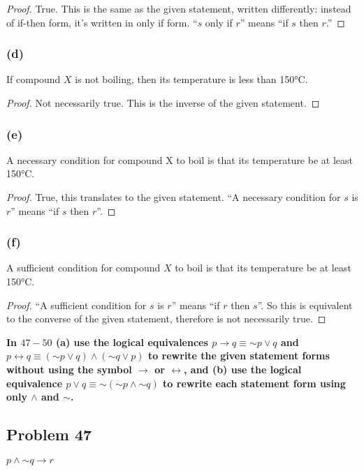 \documentclass[14pt]{extarticle}
\newcommand{\bic}{\leftrightarrow}
\begin{document}
\begin{proof}
True. This is the same as the given statement, written differently: instead of if-then form, it's written in only if form. ``$s$ only if $r$'' means ``if $s$ then $r$.''
\end{proof}

\subsubsection{(d)}
If compound $X$ is not boiling, then its temperature is less than 150°C.

\begin{proof}
Not necessarily true. This is the inverse of the given statement.
\end{proof}

\subsubsection{(e)}
A necessary condition for compound X to boil is that its temperature be at least 150°C.

\begin{proof}
True, this translates to the given statement. ``A necessary condition for $s$ is $r$'' means ``if $s$ then $r$''.
\end{proof}

\subsubsection{(f)}
A sufficient condition for compound $X$ to boil is that its temperature be at least 150°C.

\begin{proof}
``A sufficient condition for $s$ is $r$'' means ``if $r$ then $s$''. So this is equivalent to the converse of the given statement, therefore is not necessarily true. 
\end{proof}

{\bf In $47-50$ (a) use the logical equivalences $p \to q \equiv {\sim p} \vee q$ and $p \bic q \equiv ({\sim p} \vee q) \wedge ({\sim q} \vee p)$ to rewrite the given statement forms without using the symbol $\to$ or $\bic$, and (b) use the logical equivalence $p \vee q \equiv {\sim({\sim p} \wedge {\sim q})}$ to rewrite each statement form using only $\wedge$ and $\sim$.}

\subsection{Problem 47}
$p \wedge {\sim q} \to r$
\end{document}
